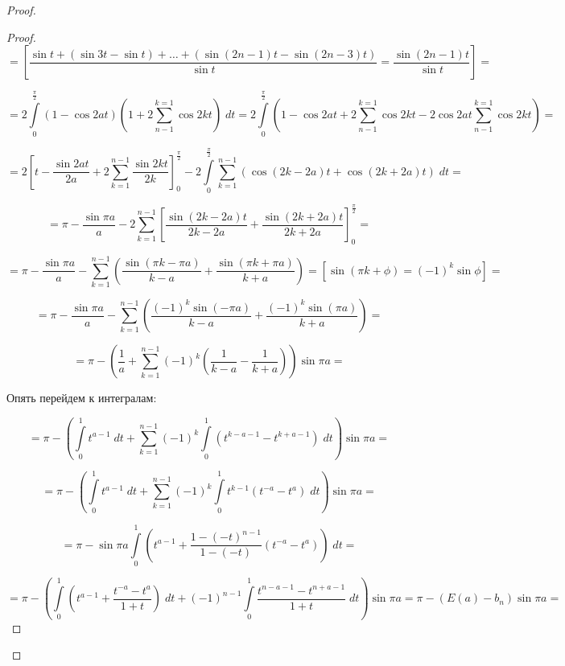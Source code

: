\documentclass[../../main.tex]{subfiles}
\begin{document}
\begin{proof}
\begin{proof}
				\[  = \left[ \frac{\sin{t} + \left( \sin{3t} - \sin{t} \right) + \dots +\left( \sin{(2n-1)t} - \sin{(2n-3)t} \right) }{\sin{t}} = \frac{\sin{(2n-1)t}}{\sin{t}} \right] =      \]
				
				\[ = 2 \int\limits_{0}^{\frac{\pi}{2}} \left( 1-\cos{2at}\right) \left( 1 + 2 \sum_{n-1}^{k = 1} \cos{2k t} \right) \; dt  = 2\int\limits_{0}^{\frac{\pi}{2}} \left( 1-\cos{2at} + 2 \sum_{n-1}^{k = 1} \cos{2k t} - 2 \cos{2at} \sum_{n-1}^{k = 1} \cos{2k t}\right) =   \]
				
				\[  = 2 \left[ t - \frac{\sin{2at}}{2a} + 2 \sum_{k=1}^{n-1}\frac{\sin{2kt}}{2k} \right]_{0}^{\frac{\pi}{2}} - 2 \int\limits_{0}^{\frac{\pi}{2}} \sum_{k=1}^{n-1} \left( \cos{(2k-2a)t} + \cos{(2k+2a)t} \right) \; dt =            \]
				
				\[  = \pi - \frac{\sin{\pi a}}{a} - 2 \sum_{k=1}^{n-1} \left[ \frac{\sin{(2k-2a)t}}{2k-2a} + \frac{\sin{(2k+2a)t}}{2k+2a} \right]_{0}^{\frac{\pi}{2}} =       \]
				
				\[    = \pi - \frac{\sin{\pi a}}{a} -  \sum_{k=1}^{n-1} \left( \frac{\sin{(\pi k- \pi a)}}{k-a} + \frac{\sin{(\pi k+ \pi a)}}{k+a} \right) = \left[ \sin{(\pi k + \phi) = \left( -1\right)^k \sin{\phi}} \right] =           \]
				
				\[  =   \pi - \frac{\sin{\pi a}}{a} - \sum_{k=1}^{n-1} \left( \frac{(-1)^k \sin{(- \pi a)}}{k-a} + \frac{(-1)^k \sin{(\pi a)}}{k+a} \right)  =          \]
				
				\[ = \pi -\left(  \frac{1}{a} + \sum_{k=1}^{n-1} (-1)^k \left( \frac{1}{k-a} - \frac{1}{k+a} \right)    \right) \sin{\pi a} =        \]
				
				Опять перейдем к интегралам:
				
				\[ = \pi - \left( \int\limits_{0}^{1} t^{a-1} \; dt + \sum_{k=1}^{n-1} (-1)^k \int\limits_{0}^{1} \left( t^{k-a-1} - t^{k+a - 1} \right) \; dt \right)  \sin{\pi a}  =           \]
				
				\[  =  \pi - \left( \int\limits_{0}^{1} t^{a-1} \; dt + \sum_{k=1}^{n-1} (-1)^k \int\limits_{0}^{1} t^{k-1} \left( t^{-a} - t^{a} \right) \; dt \right)  \sin{\pi a} =      \]
				
				\[  = \pi - \sin{\pi a} \int\limits_{0}^{1} \left( t^{a-1} + \frac{1-(-t)^{n-1}}{1-(-t)}\left( t^{-a} - t^{a} \right) \right) \; dt  =      \]
				
				\[ = \pi - \left( \int\limits_{0}^{1} \left( t^{a-1} + \frac{t^{-a} - t^a}{1+t} \right) \; dt + (-1)^{n-1} \int\limits_{0}^{1} \frac{t^{n-a-1} - t^{n+a-1}}{1+t} \; dt   \right) \sin{\pi a}  = \pi - \left( E(a) - b_n \right) \sin{\pi a} =    \]
				

\end{proof}
\end{proof}
\end{document}
